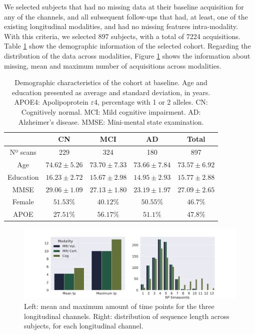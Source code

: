 We selected subjects that had no missing data at their baseline acquisition for any of the channels, and all subsequent follow-ups that had, at least, one of the existing longitudinal modalities, and had no missing features intra-modality. With this criteria, we selected 897 subjects, with a total of 7224 acquisitions. Table \ref{rnn:demographic} show the demographic information of the selected cohort. Regarding the distribution of the data across modalities, Figure \ref{fig:rnn:missingdata} shows the information about missing, mean and maximum number of acquisitions across modalities.

\begin{table}[!htbp]
\centering
\begin{tabular}{@{}ccccc@{}}
\toprule
          & CN & MCI & AD & Total \\ \midrule
Nº scans  & 229          & 324    & 180 & 897   \\
Age       & $74.62\pm5.26$ & $73.70\pm7.33$ & $73.66\pm7.84$  &  $73.57\pm6.92$     \\
Education & $16.23\pm2.72$ & $15.67\pm2.98$ & $14.95\pm2.93$  &  $15.77\pm2.88$     \\
MMSE      & $29.06\pm1.09$ & $27.13\pm1.80$ & $23.19\pm1.97$  & $27.09\pm2.65$      \\
Female    &  $51.53 \%$   & $40.12 \%$      &  $50.55\%$      &  $46.7\%$    \\
APOE      & $27.51\%$    & $56.17\%$        & $51.1\%$        & $47.8\%$     \\ \bottomrule
\end{tabular}
\caption[Demographic characteristics of the cohort used, at baseline.]{Demographic characteristics of the cohort at baseline. Age and education presented as average and standard deviation, in years. APOE4: Apolipoprotein $\varepsilon$4, percentage with 1 or 2 alleles. CN: Cognitively normal. MCI: Mild cognitive impairment. AD: Alzheimer’s disease. MMSE: Mini-mental state examination. }\label{rnn:demographic}
\end{table}

\begin{figure}[!htbp]
  \centering
  \includegraphics[width=1.0\textwidth]{figures/rnnvae/rnn_long.pdf}
  \caption[Time point distribution of ADNI data.]{Left: mean and maximum amount of time points for the three longitudinal channels. Right: distribution of sequence length across subjects, for each longitudinal channel.}\label{fig:rnn:missingdata}
\end{figure}

